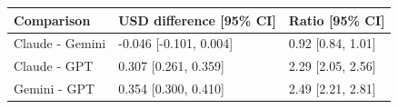 \begin{tabular}{lll}
\hline
Comparison & USD difference [95\% CI] & Ratio [95\% CI] \\
\hline
Claude - Gemini & -0.046 [-0.101, 0.004] & 0.92 [0.84, 1.01] \\
Claude - GPT & 0.307 [0.261, 0.359] & 2.29 [2.05, 2.56] \\
Gemini - GPT & 0.354 [0.300, 0.410] & 2.49 [2.21, 2.81] \\
\hline
\end{tabular}
